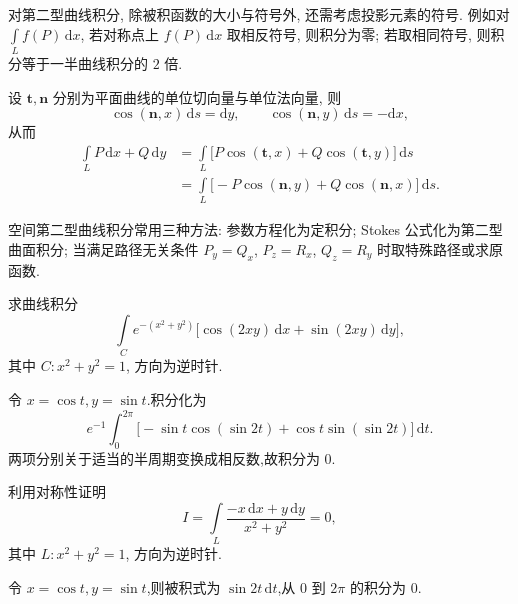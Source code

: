 \begin{theorem}
    对第二型曲线积分, 除被积函数的大小与符号外, 还需考虑投影元素的符号. 例如对 $\displaystyle\int\limits_L f(P)\,\mathrm{d}x$, 若对称点上 $f(P)\,\mathrm{d}x$ 取相反符号, 则积分为零; 若取相同符号, 则积分等于一半曲线积分的 $2$ 倍.
\end{theorem}

\begin{theorem}
    设 $\bm t,\bm n$ 分别为平面曲线的单位切向量与单位法向量, 则
    \[
        \cos(\bm n,x)\,\mathrm{d}s=\mathrm{d}y,
        \qquad
        \cos(\bm n,y)\,\mathrm{d}s=-\mathrm{d}x,
    \]
    从而
    \[
        \begin{aligned}
            \int\limits_L P\,\mathrm{d}x+Q\,\mathrm{d}y
             & =\int\limits_L\bigl\lbrack P\cos(\bm t,x)+Q\cos(\bm t,y)\bigr\rbrack\,\mathrm{d}s   \\
             & =\int\limits_L\bigl\lbrack -P\cos(\bm n,y)+Q\cos(\bm n,x)\bigr\rbrack\,\mathrm{d}s.
        \end{aligned}
    \]
\end{theorem}

空间第二型曲线积分常用三种方法: 参数方程化为定积分; Stokes 公式化为第二型曲面积分; 当满足路径无关条件 $P_y=Q_x$, $P_z=R_x$, $Q_z=R_y$ 时取特殊路径或求原函数.

\begin{example}
    求曲线积分
    \[
        \int\limits_C e^{-(x^2+y^2)}\bigl\lbrack \cos(2xy)\,\mathrm{d}x+\sin(2xy)\,\mathrm{d}y\bigr\rbrack,
    \]
    其中 $C:x^2+y^2=1$, 方向为逆时针.
\end{example}
\exampleblank

\begin{solution}
    令 $x=\cos t,y=\sin t$.积分化为
    \[
        e^{-1}\int_0^{2\pi}\bigl[-\sin t\cos(\sin2t)+\cos t\sin(\sin2t)\bigr]\,\mathrm{d}t.
    \]
    两项分别关于适当的半周期变换成相反数,故积分为 $0$.
\end{solution}

\begin{example}
    利用对称性证明
    \[
        I=\int\limits_L\dfrac{-x\,\mathrm{d}x+y\,\mathrm{d}y}{x^2+y^2}=0,
    \]
    其中 $L:x^2+y^2=1$, 方向为逆时针.
\end{example}
\exampleblank

\begin{solution}
    令 $x=\cos t,y=\sin t$,则被积式为 $\sin2t\,\mathrm{d}t$,从 $0$ 到 $2\pi$ 的积分为 $0$.
\end{solution}

